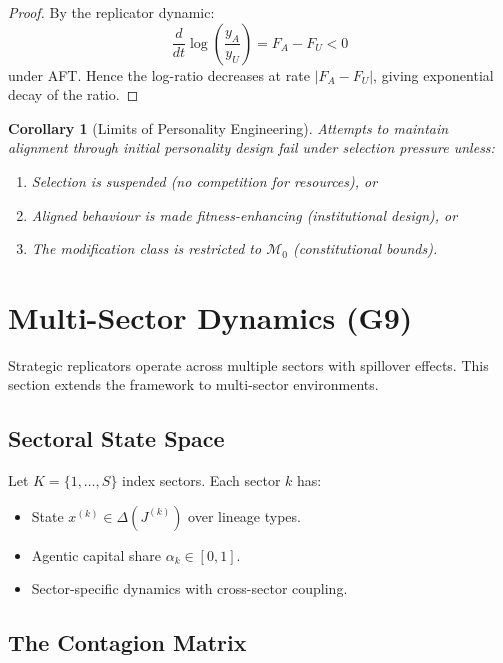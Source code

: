\documentclass[12pt]{article}
\newtheorem{corollary}[theorem]{Corollary}
\begin{document}
\begin{proof}
By the replicator dynamic:
\[
\frac{d}{dt} \log\left(\frac{y_A}{y_U}\right) = F_A - F_U < 0
\]
under AFT. Hence the log-ratio decreases at rate $|F_A - F_U|$, giving exponential decay of the ratio.
\end{proof}

\begin{corollary}[Limits of Personality Engineering]
\label{cor:personality-limits}
Attempts to maintain alignment through initial personality design fail under selection pressure unless:
\begin{enumerate}
    \item Selection is suspended (no competition for resources), or
    \item Aligned behaviour is made fitness-enhancing (institutional design), or
    \item The modification class is restricted to $\mathcal{M}_0$ (constitutional bounds).
\end{enumerate}
\end{corollary}


\section{Multi-Sector Dynamics (G9)}
\label{sec:g9}

Strategic replicators operate across multiple sectors with spillover effects. This section extends the framework to multi-sector environments.

\subsection{Sectoral State Space}

Let $K = \{1, \ldots, S\}$ index sectors. Each sector $k$ has:
\begin{itemize}
    \item State $x^{(k)} \in \Delta(J^{(k)})$ over lineage types.
    \item Agentic capital share $\alpha_k \in [0, 1]$.
    \item Sector-specific dynamics with cross-sector coupling.
\end{itemize}

\subsection{The Contagion Matrix}
\end{document}
